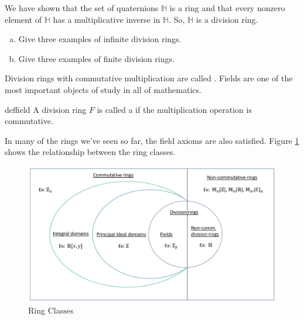 We have shown that the set of quaternions ${\mathbb H}$ is a ring and that every nonzero element of ${\mathbb H}$ has a multiplicative inverse in ${\mathbb H}$.  So, ${\mathbb H}$ is a division ring.


\begin{exercise}{}
\begin{enumerate}[(a)]
\item
Give three examples of infinite division rings.
\item
Give three examples of finite division rings.
\end{enumerate}
\end{exercise}

Division rings with commutative multiplication are called .  Fields are one of the most important objects of study in all of mathematics.

\begin{defn}{deffield}
A division ring $F$ is called a  if the multiplication operation is commutative. \end{defn}

In many of the rings we've seen so far, the field axioms are also satisfied.  Figure \ref{fig:ring_classes} shows the relationship between the ring classes.

\begin{figure}[H]
\centerline {
\includegraphics[width=5.5in]{images/RingClasses.jpg} }
\caption{Ring Classes}\label{fig:ring_classes}
\end{figure}

